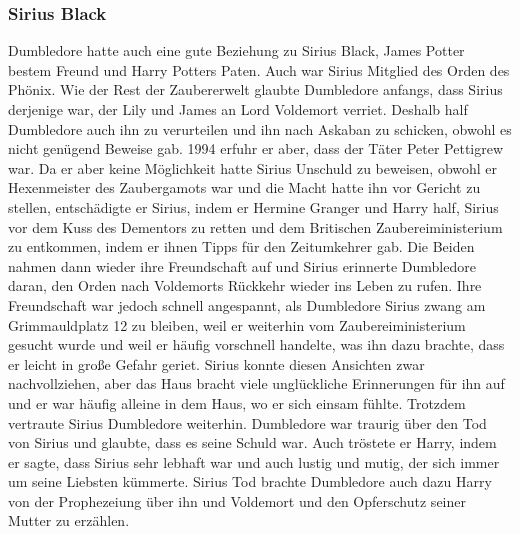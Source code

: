 \documentclass[a4paper, 10pt]{article}
\begin{document}
\subsubsection*{\large Sirius Black}
Dumbledore hatte auch eine gute Beziehung zu Sirius Black, James Potter bestem Freund und Harry Potters Paten. Auch war Sirius Mitglied des Orden des Phönix. Wie der Rest der Zaubererwelt glaubte Dumbledore anfangs, dass Sirius derjenige war, der Lily und James an Lord Voldemort verriet. Deshalb half Dumbledore auch ihn zu verurteilen und ihn nach Askaban zu schicken, obwohl es nicht genügend Beweise gab. 1994 erfuhr er aber, dass der Täter Peter Pettigrew war. Da er aber keine Möglichkeit hatte Sirius Unschuld zu beweisen, obwohl er Hexenmeister des Zaubergamots war und die Macht hatte ihn vor Gericht zu stellen, entschädigte er Sirius, indem er Hermine Granger und Harry half, Sirius vor dem Kuss des Dementors zu retten und dem Britischen Zaubereiministerium zu entkommen, indem er ihnen Tipps für den Zeitumkehrer gab.
\vspace{10pt}
\newline
Die Beiden nahmen dann wieder ihre Freundschaft auf und Sirius erinnerte Dumbledore daran, den Orden nach Voldemorts Rückkehr wieder ins Leben zu rufen. Ihre Freundschaft war jedoch schnell angespannt, als Dumbledore Sirius zwang am Grimmauldplatz 12 zu bleiben, weil er weiterhin vom Zaubereiministerium gesucht wurde und weil er häufig vorschnell handelte, was ihn dazu brachte, dass er leicht in große Gefahr geriet. Sirius konnte diesen Ansichten zwar nachvollziehen, aber das Haus bracht viele unglückliche Erinnerungen für ihn auf und er war häufig alleine in dem Haus, wo er sich einsam fühlte. Trotzdem vertraute Sirius Dumbledore weiterhin. Dumbledore war traurig über den Tod von Sirius und glaubte, dass es seine Schuld war. Auch tröstete er Harry, indem er sagte, dass Sirius sehr lebhaft war und auch lustig und mutig, der sich immer um seine Liebsten kümmerte. Sirius Tod brachte Dumbledore auch dazu Harry von der Prophezeiung über ihn und Voldemort und den Opferschutz seiner Mutter zu erzählen.
\end{document}
